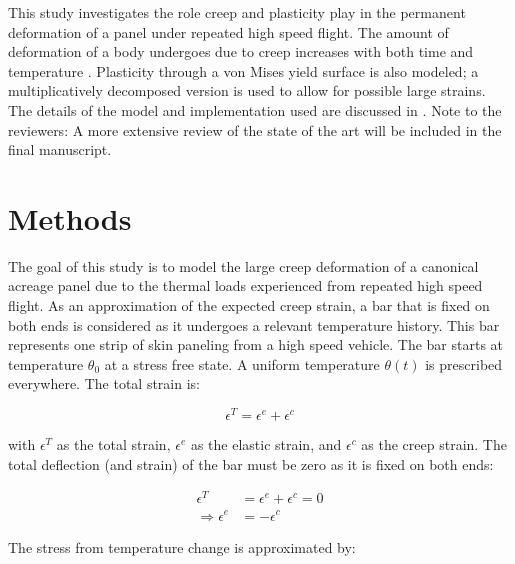 \documentclass[conf]{new-aiaa}
\begin{document}
This study investigates the role creep and plasticity play 
in the permanent deformation of a panel under repeated high speed flight.
The amount of deformation of a body undergoes due to creep increases 
with both time and temperature
\cite{roylance_mechanics_of_materials_text}. 
Plasticity through a von Mises yield surface is also modeled;
a multiplicatively decomposed version is used to allow for 
possible large strains.
The details of the model and implementation used are
discussed in 
\cite{ li_simulation_of_finite_strain_inelastic_phenomena_governed_by_creep_and_plasticity}.
\newline
\newline
Note to the reviewers: A more extensive review of the 
state of the art will be included in the 
final manuscript.

\section{Methods} \label{sec_methods}

The goal of this study is to model the large creep deformation of a canonical acreage
panel due to the thermal loads experienced from repeated high speed flight.
As an approximation of the expected creep strain,
a bar that is fixed on both ends is considered as it 
undergoes a relevant temperature history.
This bar represents one strip of skin paneling from 
a high speed vehicle.
The bar starts at temperature $\theta_0$ at a stress free state. 
A uniform temperature $\theta(t)$ is prescribed everywhere.
The total strain is:

\begin{equation}
\epsilon^T = \epsilon^e + \epsilon^c
\end{equation}

\noindent
with $\epsilon^T$ as the total strain,
$\epsilon^e$ as the elastic strain,
and
$\epsilon^c$ as the creep strain.
The total deflection (and strain) of the bar must be zero as it 
is fixed on both ends:

\begin{align}
\epsilon^T &= \epsilon^e + \epsilon^c = 0 \\
\Rightarrow
  \epsilon^e &= -\epsilon^c 
\end{align}

The stress from temperature change is approximated by:
\end{document}
